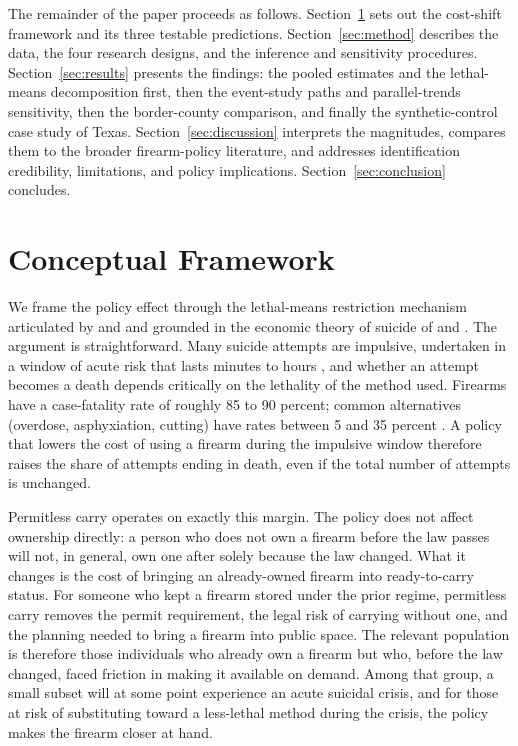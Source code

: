 \documentclass[12pt]{article}
\begin{document}
The remainder of the paper proceeds as follows.
Section~\ref{sec:theory} sets out the cost-shift framework and its
three testable predictions. Section~\ref{sec:method} describes the
data, the four research designs, and the inference and sensitivity
procedures. Section~\ref{sec:results} presents the findings: the
pooled estimates and the lethal-means decomposition first, then the
event-study paths and parallel-trends sensitivity, then the
border-county comparison, and finally the synthetic-control case
study of Texas. Section~\ref{sec:discussion} interprets the
magnitudes, compares them to the broader firearm-policy literature,
and addresses identification credibility, limitations, and policy
implications. Section~\ref{sec:conclusion} concludes.

\section{Conceptual Framework}\label{sec:theory}

We frame the policy effect through the lethal-means restriction
mechanism articulated by \citet{millerhemenway1999} and
\citet{miller2002a} and grounded in the economic theory of suicide
of \citet{hammermesh1974} and \citet{becker1968}. The argument is
straightforward. Many suicide attempts are impulsive, undertaken in
a window of acute risk that lasts minutes to hours
\citep{simon2001, hawton2007}, and whether an attempt becomes a
death depends critically on the lethality of the method used.
Firearms have a case-fatality rate of roughly 85 to 90 percent;
common alternatives (overdose, asphyxiation, cutting) have rates
between 5 and 35 percent \citep{conner2019}. A policy that lowers
the cost of using a firearm during the impulsive window therefore
raises the share of attempts ending in death, even if the total
number of attempts is unchanged.

Permitless carry operates on exactly this margin. The policy does
not affect ownership directly: a person who does not own a firearm
before the law passes will not, in general, own one after solely
because the law changed. What it changes is the cost of bringing
an already-owned firearm into ready-to-carry status. For someone
who kept a firearm stored under the prior regime, permitless carry
removes the permit requirement, the legal risk of carrying without
one, and the planning needed to bring a firearm into public space.
The relevant population is therefore those individuals who already
own a firearm but who, before the law changed, faced friction in
making it available on demand. Among that group, a small subset
will at some point experience an acute suicidal crisis, and for
those at risk of substituting toward a less-lethal method during
the crisis, the policy makes the firearm closer at hand.
\end{document}
